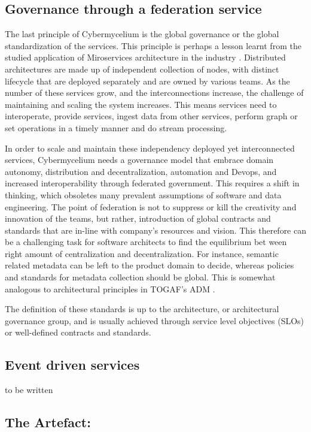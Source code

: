 \documentclass[review]{elsarticle}
\begin{document}
\subsection{Governance through a federation service}

The last principle of Cybermycelium is the global governance or the global standardization of the services. This principle is perhaps a lesson learnt from the studied application of Miroservices architecture in the industry \cite{alshuqayran2016systematic}. Distributed architectures are made up of independent collection of nodes, with distinct lifecycle that are deployed separately and are owned by various teams. As the number of these services grow, and the interconnections increase, the challenge of maintaining and scaling the system increases. This means services need to interoperate, provide services, ingest data from other services, perform graph or set operations in a timely manner and do stream processing. 

In order to scale and maintain these independency deployed yet interconnected services, Cybermycelium needs a governance model that embrace domain autonomy, distribution and decentralization, automation and Devops, and increased interoperability through federated government. This requires a shift in thinking, which obsoletes many prevalent assumptions of software and data engineering. The point of federation is not to suppress or kill the creativity and innovation of the teams, but rather, introduction of global contracts and standards that are in-line with company's resources and vision. This therefore can be a challenging task for software architects to find the  equilibrium bet ween right amount of centralization and decentralization. For instance, semantic related metadata can be left to the product domain to decide, whereas policies and standards for metadata collection should be global. This is somewhat analogous to architectural principles in TOGAF's ADM \cite{josey2016togaf}.

The definition of these standards is up to the architecture, or architectural governance group, and is usually achieved through service level objectives (SLOs) or well-defined contracts and standards.

\subsection{Event driven services}

to be written

\subsection{The Artefact:}
\end{document}
